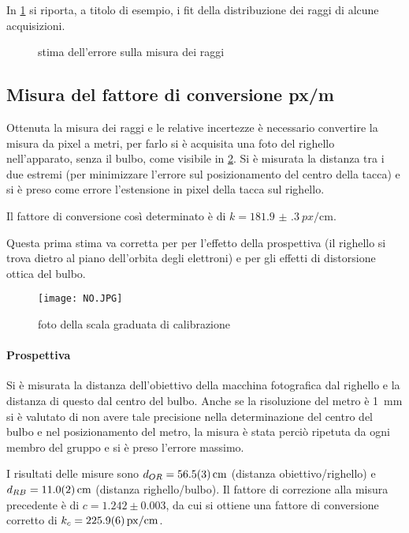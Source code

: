 In \figurename{ \ref{gauss}} si riporta, a titolo di esempio, i fit della distribuzione dei raggi di alcune acquisizioni.

\begin{figure}[H]
	\centering
	\caption{stima dell'errore sulla misura dei raggi}
	\label{gauss}
\end{figure}

\subsection{Misura del fattore di conversione px/m}

Ottenuta la misura dei raggi e le relative incertezze è necessario convertire la misura da pixel a metri, per farlo si è acquisita una foto del righello nell'apparato, senza il bulbo, come visibile in \figurename{ \ref{righello}}. Si è misurata la distanza tra i due estremi (per minimizzare l'errore sul posizionamento del centro della tacca) e si è preso come errore l'estensione in pixel della tacca sul righello.

Il fattore di conversione così determinato è di $k = \SI{181.9(3)}{px/\cm}$.

Questa prima stima va corretta per per l'effetto della prospettiva (il righello si trova dietro al piano dell'orbita degli elettroni) e per gli effetti di distorsione ottica del bulbo.

\begin{figure}[H]
	\centering
	\texttt{[image: NO.JPG]}
	\caption{foto della scala graduata di calibrazione}
	\label{righello}
\end{figure}

\paragraph{Prospettiva}	Si è misurata la distanza dell'obiettivo della macchina fotografica dal righello e la distanza di questo dal centro del bulbo. Anche se la risoluzione del metro è \SI{1}{\mm} si è valutato di non avere tale precisione nella determinazione del centro del bulbo e nel posizionamento del metro, la misura è stata perciò ripetuta da ogni membro del gruppo e si è preso l'errore massimo.

I risultati delle misure sono $d_{OR} = \SI{56.5 \pm 0.3}{\cm}$ (distanza obiettivo/righello) e $d_{RB} = \SI{11 \pm 0.2}{\cm}$ (distanza righello/bulbo).
Il fattore di correzione alla misura precedente è di $c = {1.242 \pm 0.003}$, da cui si ottiene una fattore di conversione corretto di $k_c = \SI{225.9 \pm 0.6}{px/\cm}$.

